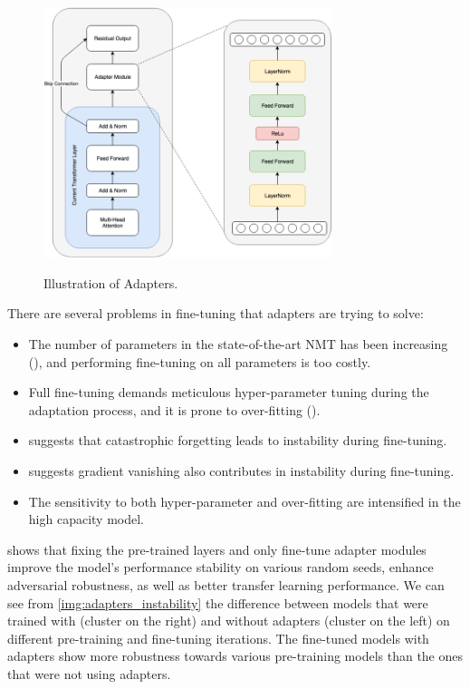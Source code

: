 \begin{figure}[h]
    {\includegraphics[width=0.75\textwidth]{img/adapter_module.png}}
    \centering
    \caption{Illustration of Adapters.}
    \label{img:adapters}
\end{figure}

There are several problems in fine-tuning that adapters are trying to solve:
\begin{itemize}
    \item The number of parameters in the state-of-the-art NMT has been increasing (\cite{Shazeer2018MeshTensorFlowDL,Bapna2018TrainingDN,Huang2019GPipeET}), and performing fine-tuning on all parameters is too costly.
    \item Full fine-tuning demands meticulous hyper-parameter tuning during the adaptation process, and it is prone to over-fitting (\cite{Sennrich2016ImprovingNM,Barone2017RegularizationTF}).
    \item \cite{Lee2020MixoutER} suggests that catastrophic forgetting leads to instability during fine-tuning.
    \item \cite{Mosbach2021OnTS} suggests gradient vanishing also contributes in instability during fine-tuning.
    \item The sensitivity to both hyper-parameter and over-fitting are intensified in the high capacity model.
\end{itemize}

\cite{han2021robust} shows that fixing the pre-trained layers and only fine-tune adapter modules improve the model's performance stability on various random seeds, enhance adversarial robustness, as well as better transfer learning performance. We can see from \cref{img:adapters_instability} the difference between models that were trained with (cluster on the right) and without adapters (cluster on the left) on different pre-training and fine-tuning iterations. The fine-tuned models with adapters show more robustness towards various pre-training models than the ones that were not using adapters.

